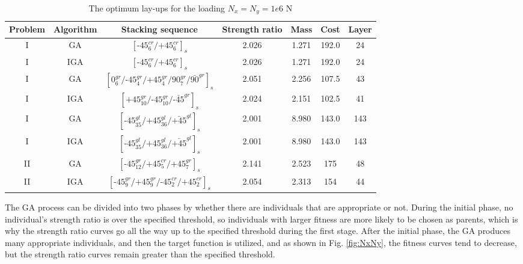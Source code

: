 \documentclass[USenglish,twocolumn]{article}
\begin{document}
\begin{table}[h]
\caption{The optimum lay-ups for the loading $N_x=N_y=1e6$ N}
\centering
\begin{adjustbox}{width=1\textwidth}
\begin{tabular}{ccccccc}
	\toprule
	 Problem  &   Algorithm      & Stacking sequence                                    & Strength ratio  & Mass  &  Cost   & Layer    \\ 
	\midrule																								  
	      I   &  GA   &  $[\text{-}45_{6}^{cr}/\text{+}45_{6}^{cr}]_s$                        & 2.026           & 1.271 &  192.0  & 24  \\
	      I   &  IGA   &  $[\text{-}45_{6}^{cr}/\text{+}45_{6}^{cr}]_s$                        & 2.026           & 1.271 &  192.0  & 24  \\
	      I   &  GA    &  $[0_6^{gr}/\text{-}45_{4}^{gr}/\text{+}45_{4}^{gr}/90_{7}^{gr}/\bar{90}^{gr}]_s$     & 2.051           & 2.256 &  107.5  & 43  \\
	      I   &  IGA    &  $[\text{+}45_{10}^{gr}/\text{-}45_{10}^{gr}/\bar{\text{-}45}^{gr}]_s$    & 2.024           & 2.151 &  102.5  & 41  \\
	      I   &  GA    &  $[\text{-}45_{35}^{gl}/\text{+}45_{36}^{gl}/\bar{\text{+}45}^{gl}]_s$    & 2.001           & 8.980 &  143.0  & 143  \\
	      I   &  IGA    &  $[\text{-}45_{35}^{gl}/\text{+}45_{36}^{gl}/\bar{\text{+}45}^{gl}]_s$    & 2.001           & 8.980 &  143.0  & 143  \\
	      II  &  GA    &
	$[\text{-}45_{12}^{gr}/\text{+}45_{5}^{cr}/\text{+}45_{7}^{gr}]_s$         & 2.141
										  & 2.523 & 175& 48  \\
	      II  &  IGA    &
	$[\text{-}45_{9}^{gr}/\text{+}45_{9}^{gr}/\text{-}45_{2}^{cr}/\text{+}45_{2}^{cr}]_s$         & 2.054
										  & 2.313 & 154& 44  \\
	\bottomrule
\end{tabular}
\end{adjustbox}
\label{tab:NxNy}
\end{table}

The GA process can be divided into two phases by whether there are individuals that are appropriate
or not. During the initial phase, no individual's strength ratio is over the specified threshold, so
individuals with larger fitness are more likely to be chosen as parents, which is why the strength
ratio curves go all the way up to the specified threshold during the first stage. After the initial
phase, the GA produces many appropriate individuals, and then the target function is utilized, and
as shown in Fig. \ref{fig:NxNy}, the fitness curves tend to decrease, but the
strength ratio curves remain greater than the specified threshold.
\end{document}

